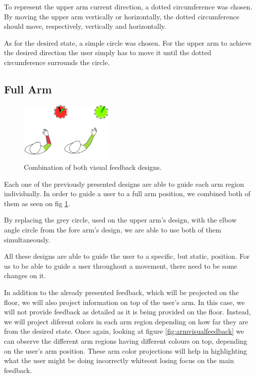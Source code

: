 To represent the upper arm current direction, a dotted circumference was chosen. By moving the upper arm vertically or horizontally, the dotted circumference should move, respectively, vertically and horizontally.


As for the desired state, a simple circle was chosen. For the upper arm to achieve the desired direction the user simply has to move it until the dotted circumference surrounds the circle.

\subsection{Full Arm}

\begin{figure}[!b]
    \begin{center}
        \includegraphics[width=0.4\textwidth]{imgs/fullarmfeedback.png}
    \end{center}
    \caption{Combination of both visual feedback designs.}
    \label{fig:fullarmfeedback}
\end{figure}

Each one of the previously presented designs are able to guide each arm region individually.
In order to guide a user to a full arm position, we combined both of them as seen on fig \ref{fig:fullarmfeedback}.

By replacing the grey circle, used on the upper arm's design, with the elbow angle circle from the fore arm's design, we are able to use both of them simultaneously. 

All these designs are able to guide the user to a specific, but static, position. For us to be able to guide a user throughout a movement, there need to be some changes on it.

In addition to the already presented feedback, which will be projected on the floor, we will also project information on top of the user's arm. 
In this case, we will not provide feedback as detailed as it is being provided on the floor. 
Instead, we will project diferent colors in each arm region depending on how far they are from the desired state. 
Once again, looking at figure \ref{fig:armvisualfeedback} we can observe the 
different arm regions having different colours on top, depending on the user's arm position.
These arm color projections will help in highlighting what the user might be doing incorrectly whiteout losing focus on the main feedback.


